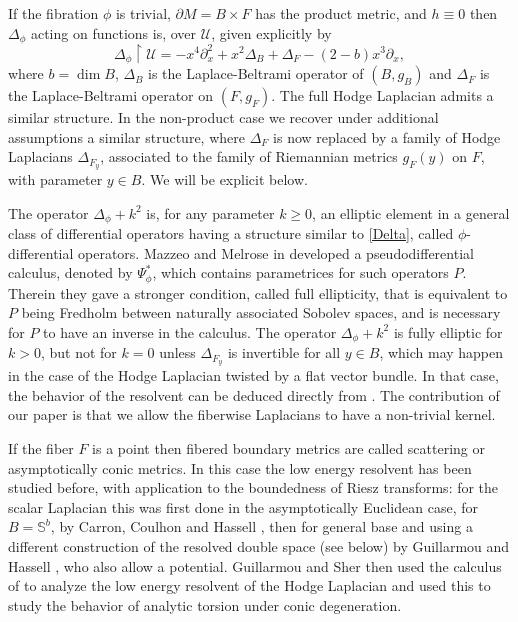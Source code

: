 If the fibration $\phi$ is trivial, $\partial M=B\times F$ has the product metric, and
$h\equiv 0$ then $\Delta_{\phi}$ acting on functions is, over $\mathscr{U}$, given explicitly by
\begin{equation}\label{Delta}
\Delta_{\phi} \restriction \mathscr{U} = -x^{4}\partial_{x}^{2} + x^{2}\Delta_{B} + \Delta_{F} - (2-b)x^{3}\partial_{x},
\end{equation}
where $b= \dim B$, $\Delta_B$ is the Laplace-Beltrami
operator of $(B,g_{B})$ and
$\Delta_{F}$ is the Laplace-Beltrami operator on $(F,g_{F})$.
The full Hodge Laplacian admits a similar structure.
In the non-product case we recover under additional assumptions a similar structure,
where $\Delta_{F}$ is now replaced by a family of Hodge Laplacians $\Delta_{F_y}$, associated to
the family of Riemannian metrics $g_F(y)$ on $F$, with parameter $y\in B$. We will be explicit below.

The operator $\Delta_{\phi}+k^2$ is, for any parameter $k\geq0$, an elliptic element in a general class of differential operators having a structure similar to \eqref{Delta}, called $\phi$-differential operators. Mazzeo and Melrose in \cite{mazzeo1998pseudodifferential} developed a pseudodifferential calculus, denoted by $\Psi^*_\phi$, which contains parametrices for such operators $P$. Therein they gave a stronger condition, called full ellipticity, that
is equivalent to $P$ being Fredholm between naturally associated Sobolev spaces, and is necessary for $P$
to have an inverse in the calculus. The operator $\Delta_{\phi}+k^2$ is fully elliptic for $k>0$, but not for $k=0$ unless $\Delta_{F_y}$ is invertible for all $y\in B$, which may happen in the case of the Hodge Laplacian twisted by a flat vector bundle.
In that case, the behavior of the resolvent can be deduced directly from
\cite{mazzeo1998pseudodifferential}. The contribution of our paper is that we allow the fiberwise Laplacians to have a non-trivial kernel.

If the fiber $F$ is a point then fibered boundary metrics are called scattering or asymptotically conic metrics. In this case the low energy resolvent has been studied before, with application to the boundedness of Riesz transforms:
for the scalar Laplacian this was first done in the asymptotically Euclidean case, \ie for $B= \mathbb{S}^b$, by
Carron, Coulhon and Hassell \cite{carron2006riesz}, then for general base and using a different construction of the resolved double space (see below) by Guillarmou and Hassell
\cite{guillarmou2008resolvent, guillarmou2009resolvent}, who also allow a potential.
Guillarmou and Sher \cite{guillarmou2014low} then used the calculus of \cite{guillarmou2008resolvent} to analyze the low energy resolvent of the Hodge Laplacian and used this to study the behavior of analytic torsion under conic degeneration.

